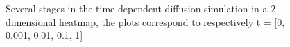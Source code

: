 \documentclass[a4paper]{article}
\begin{document}
\begin{figure}[h]
\centering
{}
\\
\\
\caption{Several stages in the time dependent diffusion simulation in a 2 dimensional heatmap, the plots correspond to respectively t = [0, 0.001, 0.01, 0.1, 1]}
\label{fig:2Ddiffusion}
\end{figure}
\end{document}
